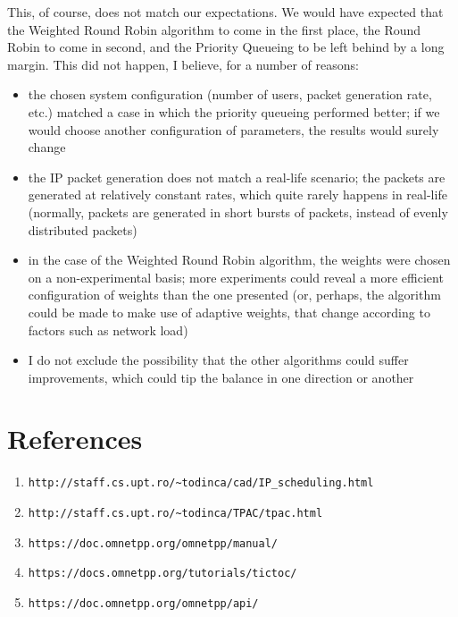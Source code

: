 \documentclass[12pt]{article}
\begin{document}
    This, of course, does not match our expectations. We would have expected that the Weighted Round Robin algorithm to come in the first place, the Round Robin to come in second, and the Priority Queueing to be left behind by a long margin. This did not happen, I believe, for a number of reasons:
    \begin{itemize}
        \item{the chosen system configuration (number of users, packet generation rate, etc.) matched a case in which the priority queueing performed better; if we would choose another configuration of parameters, the results would surely change}
        \item{the IP packet generation does not match a real-life scenario; the packets are generated at relatively constant rates, which quite rarely happens in real-life (normally, packets are generated in short bursts of packets, instead of evenly distributed packets)}
        \item{in the case of the Weighted Round Robin algorithm, the weights were chosen on a non-experimental basis; more experiments could reveal a more efficient configuration of weights than the one presented (or, perhaps, the algorithm could be made to make use of adaptive weights, that change according to factors such as network load)}
        \item{I do not exclude the possibility that the other algorithms could suffer improvements, which could tip the balance in one direction or another}
    \end{itemize}
    \pagebreak

    \section{References}
    \begin{enumerate}[label=(\arabic*)]
        \item{\verb|http://staff.cs.upt.ro/~todinca/cad/IP_scheduling.html|}
        \item{\verb|http://staff.cs.upt.ro/~todinca/TPAC/tpac.html|}
        \item{\verb|https://doc.omnetpp.org/omnetpp/manual/|}
        \item{\verb|https://docs.omnetpp.org/tutorials/tictoc/|}
        \item{\verb|https://doc.omnetpp.org/omnetpp/api/|}
    \end{enumerate}
\end{document}
